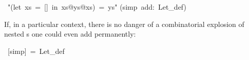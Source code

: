\begin{isabelle}%
\ {"}(let\ xs\ =\ []\ in\ xs@ys@xs)\ =\ ys{"}\isanewline
{}(simp\ add:\ Let\_def)%
\begin{isamarkuptext}%
If, in a particular context, there is no danger of a combinatorial explosion
of nested s one could even add  permanently:%
\end{isamarkuptext}%
\ [simp]\ =\ Let\_def\end{isabelle}%
